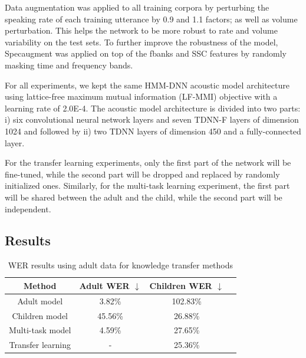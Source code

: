 Data augmentation was applied to all training corpora by perturbing the speaking rate of each training utterance by 0.9 and 1.1 factors; as well as volume perturbation. This helps the network to be more robust to rate and volume variability on the test sets. To further improve the robustness of the model, Specaugment \cite{specaugment}  was applied on top of the fbanks and SSC features by randomly masking time and frequency bands.

For all experiments, we kept the same HMM-DNN acoustic model architecture using lattice-free maximum mutual information (LF-MMI) objective with a learning rate of 2.0E-4. The acoustic model architecture is divided into two parts: i) six convolutional neural network layers and seven TDNN-F layers of dimension 1024  and followed by ii) two TDNN layers of dimension 450 and a fully-connected layer.

For the transfer learning experiments, only the first part of the network will be fine-tuned, while the second part will be dropped and replaced by randomly initialized ones. Similarly, for the multi-task learning experiment, the first part will be shared between the adult and the child, while the second part will be independent.



\subsection{Results}
\begin{table}[h]
\centering
\begin{tabular}{c|ccc}
\hline
 Method & Adult WER $\downarrow$   & Children WER  $\downarrow$   \\ \hline
\multicolumn{1}{c|}{Adult model} & 3.82\%   &  102.83\%\\ 
\multicolumn{1}{c|}{Children model} & 45.56\%  & 26.88\% \\ 
\multicolumn{1}{c|}{Multi-task model}  &   4.59\% &  27.65\% \\ 
\multicolumn{1}{c|}{Transfer learning} &  -  & 25.36\% \\ \hline


\end{tabular}

\caption{WER results using adult data for knowledge transfer methods}
\label{tab:res_exp1}
\end{table}

